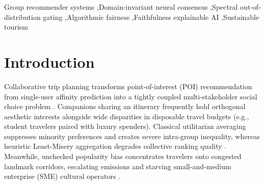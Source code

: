 \documentclass[final,5p,twocolumn]{elsarticle}
\begin{document}
\begin{frontmatter}
\begin{abstract}
cardinalities ($|G|{=}2..5$), five seeds ($0.5145 \pm 0.0241$), five global cities across five continents, and the independent $77{,}500$-POI \textit{TripWorld-Osaka} (2026) out-of-town benchmark ($\text{NDCG@10} = 0.5891$ vs.\ LightGBM $0.4926$, $\text{Gini} = 0.0589$). End-to-end 32-step Integrated Gradients sweeps all five XAI faithfulness metrics ($\text{MAE} = 3.3 \times 10^{-5}$, $\text{InsAUC} = 0.6075$, $\text{DelAUC} = 0.5482$, $5.33\times$ Comprehensiveness), while Nash recourse ($+6.39\%$ welfare) and deterministic verification ($100.0\%$ \textit{TravelPlanner} budget feasibility in $0.898\text{ ms}$/task) guarantee deployment safety.
\end{abstract}

\begin{keyword}
Group recommender systems \sep Domain-invariant neural consensus \sep Spectral out-of-distribution gating \sep Algorithmic fairness \sep Faithfulness explainable AI \sep Sustainable tourism
\end{keyword}

\end{frontmatter}

\section{Introduction}
\label{sec:intro}
Collaborative trip planning transforms point-of-interest (POI) recommendation from single-user affinity prediction into a tightly coupled multi-stakeholder social choice problem \cite{masthoff2015group,cao2018attentive,islam2022survey}. Companions sharing an itinerary frequently hold orthogonal aesthetic interests alongside wide disparities in disposable travel budgets (e.g., student travelers paired with luxury spenders). Classical utilitarian averaging suppresses minority preferences and creates severe intra-group inequality, whereas heuristic Least-Misery aggregation \cite{rawls1971theory} degrades collective ranking quality \cite{xiao2017fairness,kaya2020ensuring}. Meanwhile, unchecked popularity bias concentrates travelers onto congested landmark corridors, escalating emissions and starving small-and-medium enterprise (SME) cultural operators \cite{burke2017multisided,patro2020fairrec,chen2023bias}.
\end{document}
